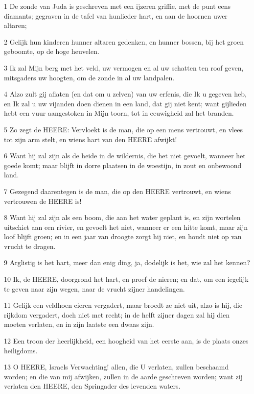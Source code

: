 \par 1 De zonde van Juda is geschreven met een ijzeren griffie, met de punt eens diamants; gegraven in de tafel van hunlieder hart, en aan de hoornen uwer altaren;
\par 2 Gelijk hun kinderen hunner altaren gedenken, en hunner bossen, bij het groen geboomte, op de hoge heuvelen.
\par 3 Ik zal Mijn berg met het veld, uw vermogen en al uw schatten ten roof geven, mitsgaders uw hoogten, om de zonde in al uw landpalen.
\par 4 Alzo zult gij aflaten (en dat om u zelven) van uw erfenis, die Ik u gegeven heb, en Ik zal u uw vijanden doen dienen in een land, dat gij niet kent; want gijlieden hebt een vuur aangestoken in Mijn toorn, tot in eeuwigheid zal het branden.
\par 5 Zo zegt de HEERE: Vervloekt is de man, die op een mens vertrouwt, en vlees tot zijn arm stelt, en wiens hart van den HEERE afwijkt!
\par 6 Want hij zal zijn als de heide in de wildernis, die het niet gevoelt, wanneer het goede komt; maar blijft in dorre plaatsen in de woestijn, in zout en onbewoond land.
\par 7 Gezegend daarentegen is de man, die op den HEERE vertrouwt, en wiens vertrouwen de HEERE is!
\par 8 Want hij zal zijn als een boom, die aan het water geplant is, en zijn wortelen uitschiet aan een rivier, en gevoelt het niet, wanneer er een hitte komt, maar zijn loof blijft groen; en in een jaar van droogte zorgt hij niet, en houdt niet op van vrucht te dragen.
\par 9 Arglistig is het hart, meer dan enig ding, ja, dodelijk is het, wie zal het kennen?
\par 10 Ik, de HEERE, doorgrond het hart, en proef de nieren; en dat, om een iegelijk te geven naar zijn wegen, naar de vrucht zijner handelingen.
\par 11 Gelijk een veldhoen eieren vergadert, maar broedt ze niet uit, alzo is hij, die rijkdom vergadert, doch niet met recht; in de helft zijner dagen zal hij dien moeten verlaten, en in zijn laatste een dwaas zijn.
\par 12 Een troon der heerlijkheid, een hoogheid van het eerste aan, is de plaats onzes heiligdoms.
\par 13 O HEERE, Israels Verwachting! allen, die U verlaten, zullen beschaamd worden; en die van mij afwijken, zullen in de aarde geschreven worden; want zij verlaten den HEERE, den Springader des levenden waters.

